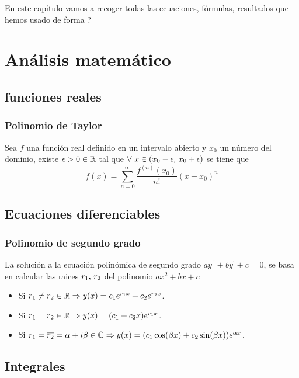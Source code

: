 \begin{summary}
    En este capítulo vamos a recoger todas las ecuaciones, fórmulas, resultados que hemos usado de forma ?
    
    \section{Análisis matemático}\label{sec:analisis-matematico}
    \subsection{funciones reales}\label{subsec:funciones-reales}
    \subsubsection*{Polinomio de Taylor}
    Sea $f$ una función real definido en un intervalo abierto y $x_0$ un número del dominio, existe $\epsilon>0\in\mathbb{R}$ tal que
    $\forall\ x\in(x_0-\epsilon,\thinspace x_0+\epsilon)$ se tiene que
    \begin{equation}
        \label{eq:polinomio-taylor}
        f(x)=\sum_{n=0}^{\infty} \frac{f^{(n)}(x_0)}{n !}(x-x_0)^n
    \end{equation}

    \subsection{Ecuaciones diferenciables}\label{subsec:ecuaciones-diferenciables}
    \subsubsection*{Polinomio de segundo grado}
    La solución a la ecuación polinómica de segundo grado $ay^{''}+by^{'}+c=0$, se basa en calcular las raices $r_1,\thinspace r_2$ del polinomio
    $ax^2+bx+c$
    \begin{itemize}
        \item Si $r_1\neq r_2\in\mathbb{R}\Rightarrow y(x)=c_{1}e^{r_{1}x}+c_{2}e^{r_{2}x}$.
        \item Si $r_1= r_2\in\mathbb{R}\Rightarrow y(x)=(c_{1}+c_{2}x)e^{r_{1}x}$.
        \item Si $r_1= \overline{r_2}=\alpha+i\beta\in\mathbb{C}\Rightarrow y(x)=(c_{1}\cos(\beta x)+c_{2}\sin(\beta x))e^{\alpha x}$.
    \end{itemize}
    \subsection{Integrales}\label{subsec:integrales}

\end{summary}

